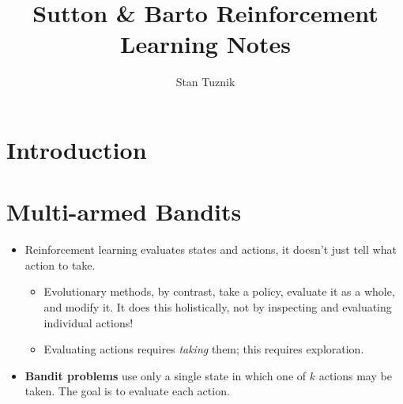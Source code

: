 



\newcommand*{\bit}{\begin{itemize}}
\newcommand*{\eit}{\end{itemize}}


\title{Sutton \& Barto Reinforcement Learning Notes}
\author{Stan Tuznik}
  


\maketitle
\tableofcontents


\chapter{Introduction}

\chapter{Multi-armed Bandits}

\bit
	\item Reinforcement learning evaluates states and actions, it doesn't just tell what action to take.
	\bit
		\item Evolutionary methods, by contrast, take a policy, evaluate it as a whole, and modify it. It does this holistically, not by inspecting and evaluating individual actions!
		\item Evaluating actions requires \emph{taking} them; this requires exploration.
	\eit
	\item \textbf{Bandit problems} use only a single state in which one of $k$ actions may be taken. The goal is to evaluate each action.
\eit

